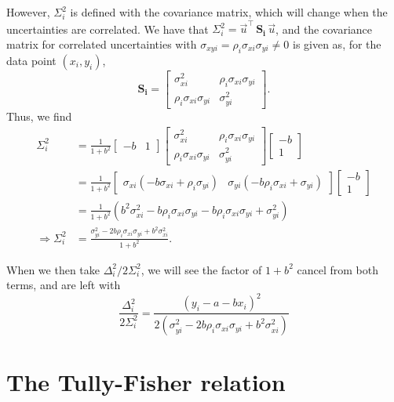 \documentclass[12pt,a4paper]{article}
\begin{document}
However, $\Sigma_i^2$ is defined with the covariance matrix, which will change when the uncertainties are correlated. We have that $\Sigma_i^2 = \vec{u}^\top\, \mathbf{S_i}\, \vec{u}$, and the covariance matrix for correlated uncertainties with $\sigma_{xyi} = \rho_i \sigma_{xi} \sigma_{yi} \neq 0$ is given as, for the data point $(x_i, y_i)$,
\begin{equation}
 \label{eqn:Si}
 \mathbf{S_i} = \begin{bmatrix}\sigma_{xi}^2 & \rho_i \sigma_{xi} \sigma_{yi} \\ \rho_i \sigma_{xi} \sigma_{yi} & \sigma_{yi}^2\end{bmatrix}.
\end{equation}
Thus, we find
\begin{align}
 \Sigma_i^2 &= \frac{1}{1 + b^2} \begin{bmatrix}-b & 1\end{bmatrix} \begin{bmatrix}\sigma_{xi}^2 & \rho_i \sigma_{xi} \sigma_{yi} \\ \rho_i \sigma_{xi} \sigma_{yi} & \sigma_{yi}^2\end{bmatrix} \begin{bmatrix}-b \\ 1\end{bmatrix} \nonumber \\
 &= \frac{1}{1 + b^2} \begin{bmatrix}\sigma_{xi} \left(-b \sigma_{xi} + \rho_i \sigma_{yi}\right) & \sigma_{yi} \left(-b \rho_i \sigma_{xi} + \sigma_{yi}\right)\end{bmatrix} \begin{bmatrix}-b \\ 1\end{bmatrix} \nonumber \\
 &= \frac{1}{1 + b^2} \left(b^2 \sigma_{xi}^2 - b \rho_i \sigma_{xi} \sigma_{yi} - b \rho_i \sigma_{xi} \sigma_{yi} + \sigma_{yi}^2\right) \nonumber \\
 \Rightarrow \Sigma_i^2 &= \frac{\sigma_{yi}^2 -2 b \rho_i \sigma_{xi} \sigma_{yi} + b^2 \sigma_{xi}^2}{1 + b^2}. \label{eqn:Sigma2}
\end{align}

When we then take $\Delta_i^2/2 \Sigma_i^2$, we will see the factor of $1 + b^2$ cancel from both terms, and are left with
\begin{equation}
 \label{eqn:ans1}
 \boxed{\frac{\Delta_i^2}{2 \Sigma_i^2} = \frac{\left(y_i - a - b x_i\right)^2}{2 \left(\sigma_{yi}^2 - 2 b \rho_i \sigma_{xi} \sigma_{yi} + b^2 \sigma_{xi}^2\right)}}
\end{equation}

\section{The Tully-Fisher relation}
\end{document}
